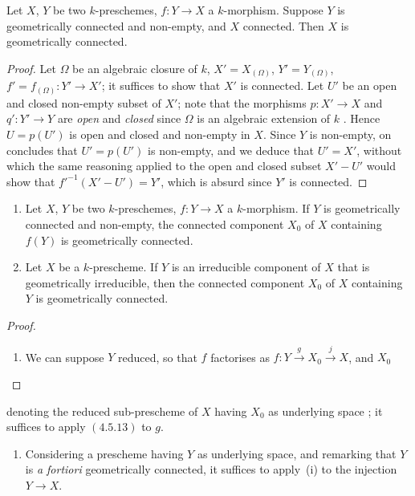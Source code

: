 \begin{proposition}[4.5.13]
\label{IV.4.5.13}
Let $X$, $Y$ be two $k$-preschemes, $f:Y\to X$ a $k$-morphism.
Suppose $Y$ is geometrically connected and non-empty, and $X$ connected.
Then $X$ is geometrically connected.
\end{proposition}

\begin{proof}
Let $\Omega$ be an algebraic closure of $k$, $X'=X_{(\Omega)}$, $Y'=Y_{(\Omega)}$, $f'=f_{(\Omega)}:Y'\to X'$; it suffices to show that $X'$ is connected.
Let $U'$ be an open and closed non-empty subset of $X'$; note that the morphisms $p:X'\to X$ and $q':Y'\to Y$ are \emph{open}  and \emph{closed} since $\Omega$ is an algebraic extension of $k$ .
Hence $U=p(U')$ is open and closed and non-empty in $X$.
Since $Y$ is non-empty, on concludes that $U'=p(U')$ is non-empty, and we deduce that $U'=X'$, without which the same reasoning applied to the open and closed subset $X'-U'$ would show that $f'^{-1}(X'-U')=Y'$, which is absurd since $Y'$ is connected.
\end{proof}

\begin{corollary}[4.5.13.1]
\label{IV.4.5.13.1}
\begin{enumerate}[label=(\roman*)]
  \item Let $X$, $Y$ be two $k$-preschemes, $f:Y\to X$ a $k$-morphism.
If $Y$ is geometrically connected and non-empty, the connected component $X_0$ of $X$ containing $f(Y)$ is geometrically connected.
  \item Let $X$ be a $k$-prescheme.
If $Y$ is an irreducible component of $X$ that is geometrically irreducible, then the connected component $X_0$ of $X$ containing $Y$ is geometrically connected.
\end{enumerate}
\end{corollary}

\begin{proof}
\begin{enumerate}[label=(\roman*)]
  \item We can suppose $Y$ reduced, so that $f$ factorises as $f:Y\xrightarrow{g}X_0\xrightarrow{j}X$, and $X_0$
\end{enumerate}
\end{proof}

denoting the reduced sub-prescheme of $X$ having $X_0$ as underlying space ; it suffices to apply $(4.5.13)$ to $g$.
\begin{enumerate}
  \item[\rm(ii)] Considering a prescheme having $Y$ as underlying space, and remarking that $Y$ is \emph{a fortiori} geometrically connected, it suffices to apply~(i) to the injection $Y\to X$.
\end{enumerate}

